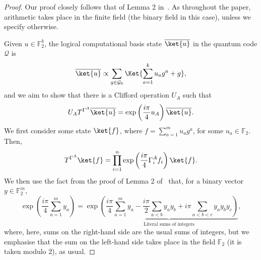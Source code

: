 \documentclass[11pt]{article}
\theoremstyle{definition}
\newcommand{\qcode}{\mathcal{Q}}
\begin{document}
\begin{proof}
    Our proof closely follows that of Lemma 2 in~\cite{bravyi2012magic}. As throughout the paper, arithmetic takes place in the finite field (the binary field in this case), unless we specify otherwise.

    Given $u \in \mathbb{F}_2^k$, the logical computational basis state $\overline{\ket{u}}$ in the quantum code $\qcode$ is
    \begin{equation}
        \overline{\ket{u}} \propto \sum_{g \in \mathcal{G}_0}\Ket{\sum_{a=1}^ku_ag^a+g},
    \end{equation}
    and we aim to show that there is a Clifford operation $U_A$ such that
    \begin{equation}
        U_AT^{\Gamma^A}\overline{\ket{u}} = \exp\left(\frac{i\pi}{4}u_A\right)\overline{\ket{u}}.
    \end{equation}
    We first consider some state $\ket{f}$, where $f = \sum_{a=1}^mu_ag^a$, for some $u_a \in \mathbb{F}_2$. Then,
    \begin{equation}\label{eq:T_action_f}
        T^{\Gamma^A}\ket{f} = \prod_{i=1}^n\exp\left(\frac{i\pi}{4}\Gamma_i^Af_i\right)\ket{f}.
    \end{equation}
    We then use the fact from the proof of Lemma 2 of~\cite{bravyi2012magic} that, for a binary vector $y \in \mathbb{F}_2^m$,
    \begin{equation}
        \exp\left(\frac{i\pi}{4}\sum_{a=1}^my_a\right) = \exp\underbrace{\left(\frac{i\pi}{4}\sum_{a=1}^my_a - \frac{i\pi}{2}\sum_{a<b}y_ay_b+i\pi\sum_{a<b<c}y_ay_by_c\right)}_{\text{Literal sums of integers}},
    \end{equation}
    where, here, sums on the right-hand side are the usual sums of integers, but we emphasise that the sum on the left-hand side takes place in the field $\mathbb{F}_2$ (it is taken modulo 2), as usual.


\end{proof}
\end{document}
